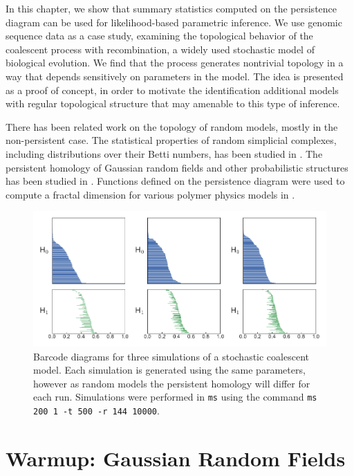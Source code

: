 In this chapter, we show that summary statistics computed on the persistence diagram can be used for likelihood-based parametric inference.
We use genomic sequence data as a case study, examining the topological behavior of the coalescent process with recombination, a widely used stochastic model of biological evolution.
We find that the process generates nontrivial topology in a way that depends sensitively on parameters in the model.
The idea is presented as a proof of concept, in order to motivate the identification additional models with regular topological structure that may amenable to this type of inference.


There has been related work on the topology of random models, mostly in the non-persistent case.
The statistical properties of random simplicial complexes, including distributions over their Betti numbers, has been studied in \cite{Kahle:2011ep,Kahle:2013vy}.
The persistent homology of Gaussian random fields and other probabilistic structures has been studied in \cite{Adler:2010}.
Functions defined on the persistence diagram were used to compute a fractal dimension for various polymer physics models in \cite{MacPherson:2012eq}.


\begin{figure}
\centering
\includegraphics[width=\textwidth]{fig/parametric_inference/sim_barcodes.pdf}
\caption[Barcode Diagrams for Three Coalescent Simulations]{Barcode diagrams for three simulations of a stochastic coalescent model. Each simulation is generated using the same parameters, however as random models the persistent homology will differ for each run. Simulations were performed in \texttt{ms} using the command \texttt{ms 200 1 -t 500 -r 144 10000}.}
\label{fig:sim_barcodes}
\end{figure}

\section{Warmup: Gaussian Random Fields}

